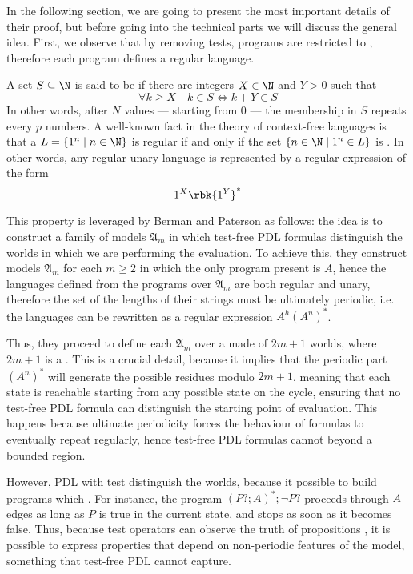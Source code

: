 \documentclass[a4paper, 12pt]{report}
\begin{document}
    In the following section, we are going to present the most important details of their proof, but before going into the technical parts we will discuss the general idea. First, we observe that by removing tests, programs are restricted to , therefore each program defines a regular language.

    A set $S \subseteq \N$ is said to be  if there are integers $X \in \N$ and $Y > 0$ such that $$\forall k \ge X \quad k \in S \iff k + Y \in S$$ In other words, after $N$ values --- starting from 0 --- the membership in $S$ repeats every $p$ numbers. A well-known fact in the theory of context-free languages is that a  $L = \{1^n \mid n \in \N\}$ is regular if and only if the set $\{n \in \N \mid 1^n \in L\}$ is . In other words, any regular unary language is represented by a regular expression of the form $$1^X \rbk{1^Y}^*$$

    This property is leveraged by Berman and Paterson as follows: the idea is to construct a family of models $\mathfrak A_m$ in which test-free PDL formulas  distinguish the worlds in which we are performing the evaluation. To achieve this, they construct models $\mathfrak A_m$ for each $m \ge 2$ in which the only program present is $A$, hence the languages defined from the programs over $\mathfrak A_m$ are both regular and unary, therefore the set of the lengths of their strings must be ultimately periodic, i.e. the languages can be rewritten as a regular expression $A^h(A^n)^*$.

    Thus, they proceed to define each $\mathfrak A_m$ over a  made of $2m + 1$ worlds, where $2m + 1$ is a . This is a crucial detail, because it implies that the periodic part $(A^n)^*$ will generate  the possible residues modulo $2m + 1$, meaning that each state is reachable starting from any possible state on the cycle, ensuring that no test-free PDL formula can distinguish the starting point of evaluation. This happens because ultimate periodicity forces the behaviour of formulas to eventually repeat regularly, hence test-free PDL formulas cannot  beyond a bounded region.

    However, PDL with test  distinguish the worlds, because it possible to build programs which . For instance, the program $(P?; A)^*; \lnot P?$ proceeds through $A$-edges as long as $P$ is true in the current state, and stops as soon as it becomes false. Thus, because test operators can observe the truth of propositions , it is possible to express properties that depend on non-periodic features of the model, something that test-free PDL cannot capture.
\end{document}
